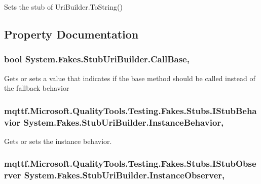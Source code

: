 Sets the stub of Uri\-Builder.\-To\-String()



\subsection{Property Documentation}
\hypertarget{class_system_1_1_fakes_1_1_stub_uri_builder_adc55e7b794d86bfdfaa8cf0a1ba52830}{
\subsubsection[{Call\-Base}]{\setlength{\rightskip}{0pt plus 5cm}bool System.\-Fakes.\-Stub\-Uri\-Builder.\-Call\-Base\hspace{0.3cm}{\ttfamily [get]}, {\ttfamily [set]}}}\label{class_system_1_1_fakes_1_1_stub_uri_builder_adc55e7b794d86bfdfaa8cf0a1ba52830}


Gets or sets a value that indicates if the base method should be called instead of the fallback behavior

\hypertarget{class_system_1_1_fakes_1_1_stub_uri_builder_a2c9c65e5522ddc4a82e288f932d098cc}{
\subsubsection[{Instance\-Behavior}]{\setlength{\rightskip}{0pt plus 5cm}mqttf.\-Microsoft.\-Quality\-Tools.\-Testing.\-Fakes.\-Stubs.\-I\-Stub\-Behavior System.\-Fakes.\-Stub\-Uri\-Builder.\-Instance\-Behavior\hspace{0.3cm}{\ttfamily [get]}, {\ttfamily [set]}}}\label{class_system_1_1_fakes_1_1_stub_uri_builder_a2c9c65e5522ddc4a82e288f932d098cc}


Gets or sets the instance behavior.

\hypertarget{class_system_1_1_fakes_1_1_stub_uri_builder_a42737b0926707cc40bb40cc7aa1737ba}{
\subsubsection[{Instance\-Observer}]{\setlength{\rightskip}{0pt plus 5cm}mqttf.\-Microsoft.\-Quality\-Tools.\-Testing.\-Fakes.\-Stubs.\-I\-Stub\-Observer System.\-Fakes.\-Stub\-Uri\-Builder.\-Instance\-Observer\hspace{0.3cm}{\ttfamily [get]}, {\ttfamily [set]}}}\label{class_system_1_1_fakes_1_1_stub_uri_builder_a42737b0926707cc40bb40cc7aa1737ba}


